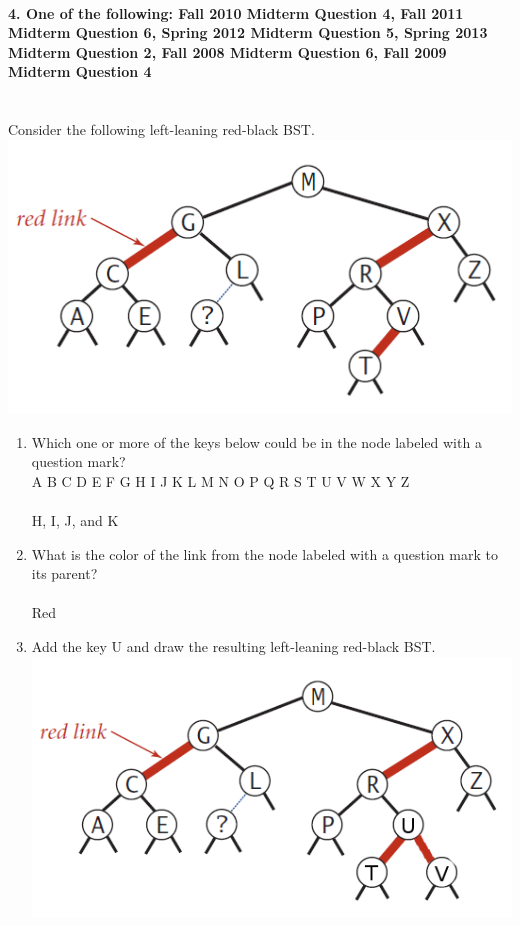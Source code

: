\documentclass{article}
\begin{document}
\paragraph{\Large 4. One of the following: Fall 2010 Midterm Question 4, Fall 2011 Midterm Question 6, Spring 2012 Midterm Question 5, Spring 2013 Midterm Question 2, Fall 2008 Midterm Question 6, Fall 2009 Midterm Question 4}\mbox{}\\
Consider the following left-leaning red-black BST.\\
\includegraphics[width=\linewidth]{RBTree.PNG}\\

\begin{enumerate}
\renewcommand{\theenumi}{\Alph{enumi}}
	\item Which one or more of the keys below could be in the node labeled with a question mark?\\
	A B C D E F G H I J K L M N O P Q R S T U V W X Y Z\\\\
	H, I, J, and K
	\item What is the color of the link from the node labeled with a question mark to its parent?\\\\
	Red
	\item Add the key U and draw the resulting left-leaning red-black BST.\\
	\includegraphics[width=\linewidth]{RBTree2.png}\\

\end{enumerate}
\end{document}
